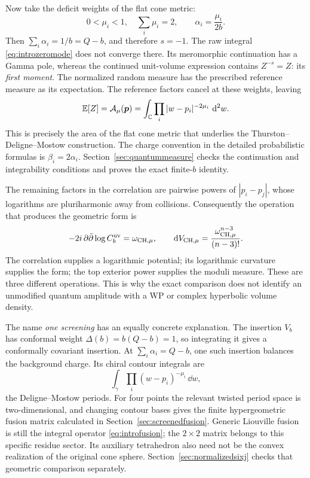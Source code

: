 Now take the deficit weights of the flat cone metric:
\[
 0<\mu_i<1,\quad \sum_i\mu_i=2,\qquad
 \alpha_i=\frac{\mu_i}{2b}.
\]
Then $\sum_i\alpha_i=1/b=Q-b$, and therefore $s=-1$.
The raw integral \eqref{eq:introzeromode} does not converge there.
Its meromorphic continuation has a Gamma pole, whereas the
continued unit-volume expression contains $Z^{-s}=Z$: its
\emph{first moment}. The normalized random measure has the prescribed
reference measure as its expectation. The reference factors cancel
at these weights, leaving
\begin{equation}
 \mathbb E[Z]=\mathcal A_\mu(\boldsymbol p)
   =\int_{\mathbb C}\prod_i|w-p_i|^{-2\mu_i}\,\mathop{}\!\mathrm d^2w.
 \label{eq:introfirstmoment}
\end{equation}
This is precisely the area of the flat cone metric that underlies
the Thurston--Deligne--Mostow construction. The charge convention
in the detailed probabilistic formulas is $\beta_i=2\alpha_i$.
Section~\ref{sec:quantummeasure} checks the continuation and
integrability conditions and proves the exact finite-$b$ identity.

The remaining factors in the correlation are pairwise powers of
$|p_i-p_j|$, whose logarithms are pluriharmonic away from collisions.
Consequently the operation that produces the geometric form is
\begin{equation}
 -2i\,\partial\bar\partial\log C_b^{\rm uv}
     =\omega_{\mathrm{CH},\mu},\qquad
 \mathop{}\!\mathrm d V_{\mathrm{CH},\mu}
     =\frac{\omega_{\mathrm{CH},\mu}^{n-3}}{(n-3)!}.
 \label{eq:introcurvaturemeasure}
\end{equation}
The correlation supplies a logarithmic potential; its logarithmic
curvature supplies the form; the top exterior power supplies the
moduli measure. These are three different operations. This is why
the exact comparison does not identify an unmodified quantum
amplitude with a WP or complex hyperbolic volume density.

The name \emph{one screening} has an equally concrete explanation.
The insertion $V_b$ has conformal weight
$\Delta(b)=b(Q-b)=1$, so integrating it gives a conformally
covariant insertion. At $\sum_i\alpha_i=Q-b$, one such insertion
balances the background charge. Its chiral contour integrals are
\[
 \int_\gamma\prod_i(w-p_i)^{-\mu_i}\,\dd w,
\]
the Deligne--Mostow periods. For four points the relevant twisted
period space is two-dimensional, and changing contour bases gives
the finite hypergeometric fusion matrix calculated in
Section~\ref{sec:screenedfusion}. Generic Liouville fusion is still
the integral operator \eqref{eq:introfusion}; the $2\times2$ matrix
belongs to this specific residue sector. Its auxiliary tetrahedron
also need not be the convex realization of the original cone
sphere. Section~\ref{sec:normalizedsixj} checks that geometric
comparison separately.

